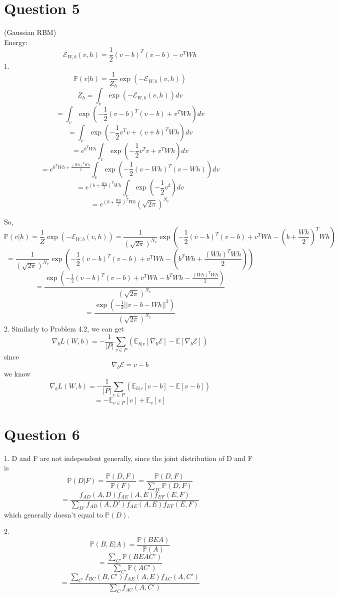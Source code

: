 \documentclass[a4 paper,12pt]{article}
\begin{document}
\section*{Question 5}
(Gaussian RBM)\\
Energy:
\begin{equation}
      \mathcal{E}_{W,b}(v,h) = \frac{1}{2}(v-b)^T(v-b) - v^TWh
\end{equation}
1. 
\[ \mathbb{P}(v|h) = \frac{1}{Z_h} \exp(-\mathcal{E}_{W,b}(v,h))\]
\[ Z_h =\int_{v} \exp(-\mathcal{E}_{W,b}(v,h))dv \]
\[ =\int_{v} \exp(-\frac{1}{2}(v-b)^T(v-b) + v^TWh)dv \]
\[ =\int_{v} \exp(-\frac{1}{2}v^Tv + (v+b)^TWh)dv \]
\[ =e^{b^TWh} \int_{v} \exp(-\frac{1}{2}v^Tv + v^TWh)dv \]
\[ =e^{b^TWh+\frac{(Wh)^TWh}{2}} \int_{v} \exp(-\frac{1}{2}(v-Wh)^T(v-Wh))dv \]
\[ =e^{(b+\frac{Wh}{2})^TWh} \int_{v} \exp(-\frac{1}{2}v^2)dv\]
\[ =e^{(b+\frac{Wh}{2})^TWh} (\sqrt{2\pi})^{N_v} \]

So,
\[ \mathbb{P}(v|h) = \frac{1}{Z} \exp(-\mathcal{E}_{W,b}(v,h)) = \frac{1}{(\sqrt{2\pi})^{N_v}} \exp(-\frac{1}{2}(v-b)^T(v-b) + v^TWh - (b+\frac{Wh}{2})^TWh) \]
\[ = \frac{1}{(\sqrt{2\pi})^{N_v}} \exp(-\frac{1}{2}(v-b)^T(v-b) + v^TWh - (b^TWh+\frac{(Wh)^TWh}{2})) \]
\[ = \frac{\exp(-\frac{1}{2}(v-b)^T(v-b) + v^TWh - b^TWh-\frac{(Wh)^TWh}{2})}{(\sqrt{2\pi})^{N_v}}  \]
\[ = \frac{\exp(-\frac{1}{2}||v-b-Wh||^2)}{(\sqrt{2\pi})^{N_v}}  \]
2.
Similarly to Problem 4.2, we can get
\[ \nabla_b L(W,b) = -\frac{1}{|P|}\sum_{v\in P}(\mathbb{E}_{h|v}[\nabla_b\mathcal{E}] - \mathbb{E}[\nabla_{b}\mathcal{E}]) \]
since 
\[ \nabla_b\mathcal{E} = v-b\]
we know
\[ \nabla_b L(W,b) = -\frac{1}{|P|}\sum_{v\in P}(\mathbb{E}_{h|v}[v-b] - \mathbb{E}[v-b]) \]
\[ = - \mathbb{E}_{v \in P}[v] + \mathbb{E}_v[v] \]

\section*{Question 6}
1. D and F are not independent generally, since the joint distribution of D and F is
\[ \mathbb{P}(D|F) = \frac{\mathbb{P}(D,F)}{\mathbb{P}(F)} = \frac{\mathbb{P}(D,F)}{\sum_{D'}\mathbb{P}(D,F)} \]
\[ = \frac{f_{AD}(A,D)f_{AE}(A,E)f_{EF}(E,F)}{\sum_{D'}f_{AD}(A,D')f_{AE}(A,E)f_{EF}(E,F)}\]
which generally doesn't equal to $\mathbb{P}(D)$.

2. 
\[ \mathbb{P}(B,E|A)= \frac{\mathbb{P}(BEA)}{\mathbb{P}(A)}\]
\[ = \frac{\sum_{C'}\mathbb{P}(BEAC')}{\sum_{C'}\mathbb{P}(AC')}\]
\[ = \frac{\sum_{C'}f_{BC}(B,C')f_{AE}(A,E)f_{AC}(A,C')}{\sum_{C}f_{AC}(A,C')}\]
\end{document}
